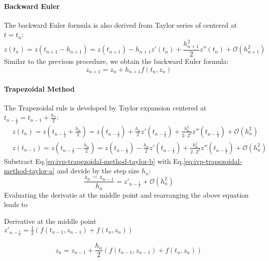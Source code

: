 \documentclass[letterpaper, 11pt]{article}
\providecommand{\note}[1]{\sidenote{{\footnotesize #1}}}
\begin{document}
\paragraph{Backward Euler}
\label{sec-1-1-1-2}
The backward Euler formula is also derived from Taylor series of centered at $t=t_{n}$:
\begin{equation}
\label{ivp-backward-euler}
z(t_{n}) = z(t_{n+1} - h_{n+1}) = z(t_{n+1}) - h_{n+1}z'(t_{n}) + \frac{h^{2}_{n+1}}{2}z''(t_{n}) + \mathcal{O}(h^{2}_{n+1})
\end{equation}
Similar to the previous procedure, we obtain the backward Euler formula\note{This is an implicit formula}:
\begin{equation}
\label{eq:ivp-backward-euler-step}
z_{n+1} = z_{n} + h_{n+1}f(t_{n},z_{n})
\end{equation}
\paragraph{Trapezoidal Method}
\label{sec-1-1-1-3}
The Trapezoidal rule is developed by Taylor expansion centered at $t_{n-\frac{1}{2}}=t_{n-1} + \frac{h_{n}}{2}$:
\begin{subequations}
\label{eq:ivp-trapezoidal-method-taylor}
\begin{align}
\label{eq:ivp-trapezoidal-method-taylor-a}
&z(t_{n}) = z(t_{n-\frac{1}{2}} + \frac{h_{n}}{2}) = z(t_{n-\frac{1}{2}}) + \frac{h_{n}}{2}z'(t_{n-\frac{1}{2}}) + \frac{h_{n}^{2}}{2\cdot2^{2}}z''(t_{n-\frac{1}{2}}) + \mathcal{O}(h^{2}_{n}) \\
\label{eq:ivp-trapezoidal-method-taylor-b}
&z(t_{n-1}) = z(t_{n-\frac{1}{2}} - \frac{h_{n}}{2}) = z(t_{n-\frac{1}{2}}) - \frac{h_{n}}{2}z'(t_{n-\frac{1}{2}}) + \frac{h_{n}^{2}}{2\cdot2^{2}}z''(t_{n-\frac{1}{2}}) + \mathcal{O}(h^{2}_{n})
\end{align}
\end{subequations}
Substract Eq.\eqref{eq:ivp-trapezoidal-method-taylor-b} with Eq.\eqref{eq:ivp-trapezoidal-method-taylor-a} and devide by the step size $h_{n}$:
\begin{equation}
\label{eq:ivp-trapezoidal-step-a}
\frac{z_{n} - z_{n-1}}{h_{n}} = z'_{n-\frac{1}{2}} + \mathcal{O}(h^{2}_{n})
\end{equation}  
Evaluating the derivatie at the middle point and rearranging the above equation leads to
\begin{margintable}
\footnotesize
Derivative at the middle point\\
$z'_{n-\frac{1}{2}} = \frac{1}{2}\left (f(t_{n-1},z_{n-1}) + f(t_{n},z_{n})\right)$
\end{margintable}

\begin{equation}
\label{eq:ivp-trapezoidal-step-b}
z_{n} = z_{n-1} + \frac{h_{n}}{2}\left (f(t_{n-1},z_{n-1}) +  f(t_{n},z_{n})\right)
\end{equation} 
\end{document}
